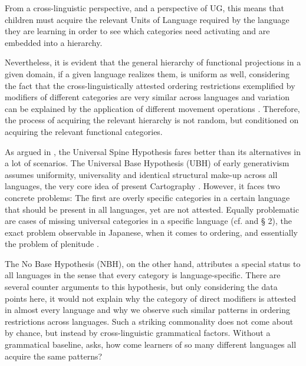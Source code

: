 From a cross-linguistic perspective, and a perspective of UG, this means that children must acquire the relevant Units of Language required by the language they are learning in order to see which categories need activating and are embedded into a hierarchy.

Nevertheless, it is evident that the general hierarchy of functional projections in a given domain, if a given language realizes them, is uniform as well, considering the fact that the cross-linguistically attested ordering restrictions exemplified by modifiers of different categories are very similar across languages and variation can be explained by the application of different movement operations \citep{cinque:2023:linearization, cinque:2025:superiority}. Therefore, the process of acquiring the relevant hierarchy is not random, but conditioned on acquiring the relevant functional categories.  

As argued in \citet{wiltschko:2014:universal}, the Universal Spine Hypothesis fares better than its alternatives in a lot of scenarios. The Universal Base Hypothesis (UBH) of early generativism \citep{chomsky:1965:aspects} assumes uniformity, universality and identical structural make-up across all languages, the very core idea of present Cartography \citep[68]{cinriz:2010:carto}. However, it faces two concrete problems: The first are overly specific categories in a certain language that should be present in all languages, yet are not attested. Equally problematic are cases of missing universal categories in a specific language (cf. \citealt[10–19]{wiltschko:2014:universal} and § 2), the exact problem observable in Japanese, when it comes to ordering, and essentially the problem of plenitude \citep{larson:2021:rethinking}. 

The No Base Hypothesis (NBH), on the other hand, attributes a special status to all languages in the sense that every category is language-specific. There are several counter arguments to this hypothesis, but only considering the data points here, it would not explain why the category of direct modifiers is attested in almost every language and why we observe such similar patterns in ordering restrictions across languages. Such a striking commonality does not come about by chance, but instead by cross-linguistic grammatical factors. Without a grammatical baseline, \citet[19–23]{wiltschko:2014:universal} asks, how come learners of so many different languages all acquire the same patterns?

